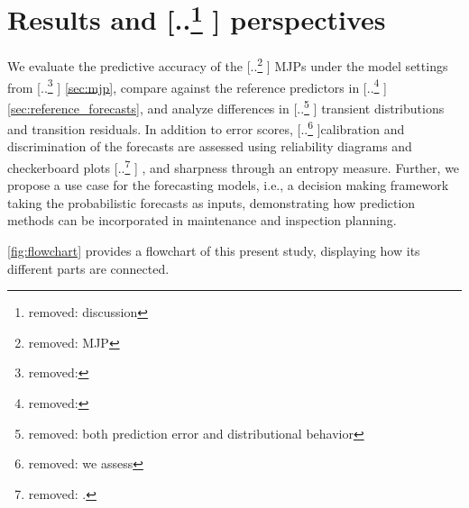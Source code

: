 \documentclass{article}
\providecommand{\DIFadd}[1]{{\protect\color{blue} \sf #1}} %
\providecommand{\DIFdel}[1]{{\protect\color{red} [..\footnote{removed: #1} ]}} %
\providecommand{\DIFaddbegin}{} %
\providecommand{\DIFaddend}{} %
\providecommand{\DIFdelbegin}{} %
\providecommand{\DIFdelend}{} %
\begin{document}
\section{Results and \DIFdelbegin \DIFdel{discussion}\DIFdelend \DIFaddbegin \DIFadd{perspectives}\DIFaddend } \label{sec:results}
We evaluate the predictive accuracy of the \DIFdelbegin \DIFdel{MJP }\DIFdelend \DIFaddbegin \DIFadd{MJPs }\DIFaddend under the model settings from \DIFdelbegin \DIFdel{}\DIFdelend \DIFaddbegin \DIFadd{\cref{sec:mjp}}\DIFaddend , compare against the reference predictors in \DIFdelbegin \DIFdel{}\DIFdelend \DIFaddbegin \DIFadd{\cref{sec:reference_forecasts}}\DIFaddend , and analyze differences in \DIFdelbegin \DIFdel{both prediction error and distributional behavior}\DIFdelend \DIFaddbegin \DIFadd{transient distributions and transition residuals}\DIFaddend . In addition to error scores, \DIFdelbegin \DIFdel{we assess }\DIFdelend calibration and discrimination \DIFaddbegin \DIFadd{of the forecasts are assessed }\DIFaddend using reliability diagrams and checkerboard plots\DIFdelbegin \DIFdel{.
}\DIFdelend \DIFaddbegin \DIFadd{, and sharpness through an entropy measure. Further, we propose a use case for the forecasting models, i.e., a decision making framework taking the probabilistic forecasts as inputs, demonstrating how prediction methods can be incorporated in maintenance and inspection planning.
}\DIFaddend 

\DIFaddbegin \DIFadd{\cref{fig:flowchart} provides a flowchart of this present study, displaying how its different parts  are connected.
}
\end{document}
